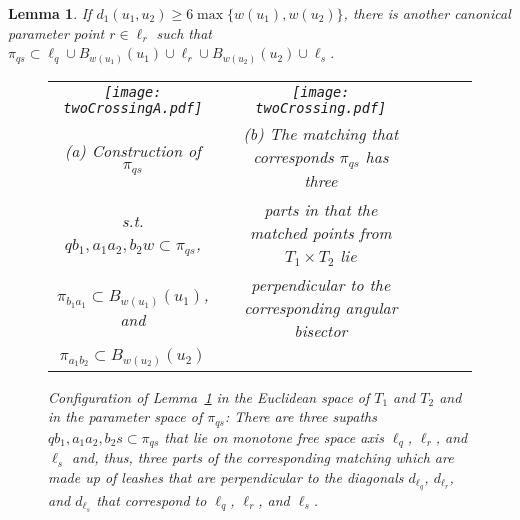 \documentclass[a4paper,11pt]{article}
\newtheorem{lemma}{Lemma}
\begin{document}
\begin{lemma}\label{lem:twoCrossing}
	If $d_1(u_1,u_2) \geq 6 \max \{ w(u_1), w(u_2) \}$, there is another canonical parameter point $r \in \ell_r$ such that $\pi_{qs} \subset \ell_{q} \cup B_{w(u_1)}(u_1) \cup \ell_{r} \cup B_{w(u_2)}(u_2) \cup \ell_s$.
	
\begin{figure}[ht]
  \begin{center}
    \begin{tabular}{ccccccc}
      \texttt{[image: twoCrossingA.pdf]} & &
       \texttt{[image: twoCrossing.pdf]}&&\\ 
{\small (a) Construction of $\pi_{qs}$} & &
      {\small (b) The matching that corresponds $\pi_{qs}$ has three}&&\\
      {\small s.t. $qb_1,a_1a_2,b_2w \subset \pi_{qs}$,}& &
      {\small parts in that the matched points from $T_1 \times T_2$ lie}&&\\
      {\small $\pi_{b_1a_1} \subset B_{w(u_1)}(u_1)$, and}&&
      {\small perpendicular to the corresponding angular bisector}&&\\
      {\small $\pi_{a_1b_2} \subset B_{w(u_2)}(u_2)$}&&
      {\small }&&
    \end{tabular}
  \end{center}
  \vspace*{-12pt}
  \caption{Configuration of Lemma~\ref{lem:twoCrossing} in the Euclidean space of $T_1$ and $T_2$ and in the parameter space of $\pi_{qs}$: There are three supaths $qb_1, a_1a_2,b_2s \subset \pi_{qs}$ that lie on monotone free space axis $\ell_q$, $\ell_r$, and $\ell_s$ and, thus, three parts of the corresponding matching which are made up of leashes that are perpendicular to the diagonals $d_{\ell_q}$, $d_{\ell_r}$, and $d_{\ell_s}$ that correspond to $\ell_q$, $\ell_r$, and $\ell_s$.}
  \label{fig:twoCrossing}
\end{figure}

\end{lemma}
\end{document}
